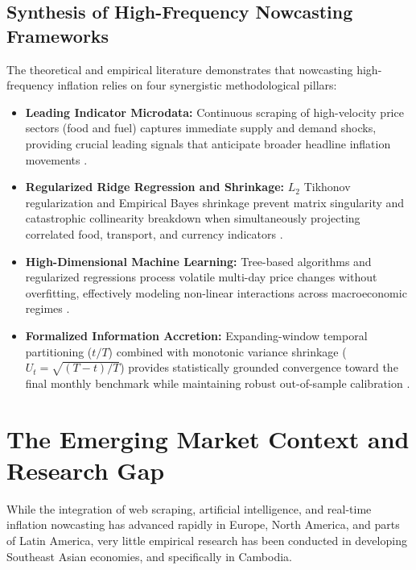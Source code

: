 \subsection{Synthesis of High-Frequency Nowcasting Frameworks}
\hs The theoretical and empirical literature demonstrates that nowcasting high-frequency inflation relies on four synergistic methodological pillars:
\begin{itemize}
    \item \textbf{Leading Indicator Microdata:} Continuous scraping of high-velocity price sectors (food and fuel) captures immediate supply and demand shocks, providing crucial leading signals that anticipate broader headline inflation movements \citep{cavallo2016billion, macias2023nowcasting}.
    \item \textbf{Regularized Ridge Regression and Shrinkage:} $L_2$ Tikhonov regularization and Empirical Bayes shrinkage prevent matrix singularity and catastrophic collinearity breakdown when simultaneously projecting correlated food, transport, and currency indicators \citep{hoerl1970ridge, demol2008forecasting}.
    \item \textbf{High-Dimensional Machine Learning:} Tree-based algorithms and regularized regressions process volatile multi-day price changes without overfitting, effectively modeling non-linear interactions across macroeconomic regimes \citep{medeiros2021forecasting, gouletcoulombe2022machine}.
    \item \textbf{Formalized Information Accretion:} Expanding-window temporal partitioning ($t/T$) combined with monotonic variance shrinkage ($U_t = \sqrt{(T-t)/T}$) provides statistically grounded convergence toward the final monthly benchmark while maintaining robust out-of-sample calibration \citep{bates1969combination, babii2022machine}.
\end{itemize}

\section{The Emerging Market Context and Research Gap}
\hs While the integration of web scraping, artificial intelligence, and real-time inflation nowcasting has advanced rapidly in Europe, North America, and parts of Latin America, very little empirical research has been conducted in developing Southeast Asian economies, and specifically in Cambodia.

